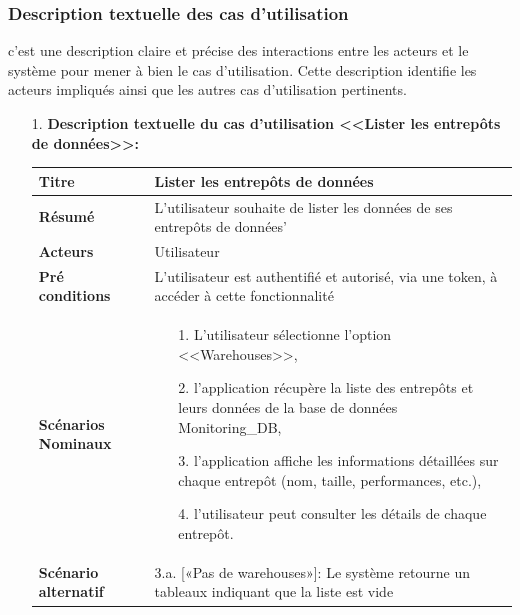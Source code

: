 \subsubsection{Description textuelle des cas d'utilisation}
\par c'est une description claire et précise des interactions entre les acteurs et le système pour mener à bien le cas d'utilisation. Cette description identifie les acteurs impliqués ainsi que les autres cas d'utilisation pertinents\cite{descp}.
\begin{enumerate}
    \item[1.] \textbf{Description textuelle du cas d'utilisation <<Lister les entrepôts de données>>:}
    \begin{table}[H]
        \centering
            \begin{tabular}{|p{3.5cm}|p{12cm}|}
                \hline \textbf{Titre} &  Lister les entrepôts de données \\
                \hline \textbf{Résumé} & L'utilisateur souhaite de lister les données de ses entrepôts de données' \\
                \hline \textbf{Acteurs} & Utilisateur\\
                \hline \textbf{Pré conditions }& L'utilisateur est authentifié et autorisé, via une token, à accéder à cette fonctionnalité\\
                \hline \textbf{Scénarios Nominaux} &
                    \begin{enumerate}
                        \item [1.] L'utilisateur sélectionne l'option <<Warehouses>>,
                        \item [2.] l'application récupère la liste des entrepôts et leurs données de la base de données Monitoring\_DB,
                        \item [3.] l'application affiche les informations détaillées sur chaque entrepôt (nom, taille, performances, etc.),
                        \item [4.] l'utilisateur peut consulter les détails de chaque entrepôt.      
                    \end{enumerate}\\
                        \hline \textbf{Scénario alternatif} & 
                        3.a. \hspace{0.3cm} [«Pas de warehouses»]: Le système retourne un tableaux indiquant que la liste est vide \newline                             \\

\end{tabular}
\end{table}
\end{enumerate}
